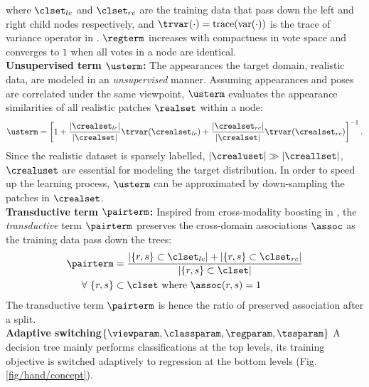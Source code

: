 where $\clset_{lc}$ and $\clset_{rc}$ are the training data that pass down the left and right child nodes respectively, and $\trvar(\cdot) = \mathrm{trace}(\mathrm{var}(\cdot))$ is the trace of variance operator in \cite{Gall2011}. 
$\regterm$ increases with compactness in vote space and converges to $1$ when all votes in a node are identical. \\ 
\textbf{Unsupervised term $\usterm$:} The appearances the target domain, \ie realistic data, are modeled in an \emph{unsupervised} manner. 
Assuming appearances and poses are correlated under the same viewpoint, $\usterm$ evaluates the appearance similarities of all realistic patches $\realset$ within a node:    
\begin{equation}
	\usterm = \left[ 1 + 
	\frac{|\crealset_{lc}|}{|\crealset|} \trvar(\crealset_{lc}) +  
\frac{|\crealset_{rc}|}{|\crealset|} \trvar(\crealset_{rc}) \right]^{-1}.  
	\label{eq:usterm}
\end{equation}
Since the realistic dataset is sparsely labelled, \ie$|\crealuset| \gg |\creallset|$, $\crealuset$ are essential for modeling the target distribution. 
In order to speed up the learning process, $\usterm$ can be approximated by down-sampling the patches in $\crealset$. \\  
\textbf{Transductive term $\pairterm$:} 
Inspired from cross-modality boosting in \cite{Bronstein2010}, 
the \emph{transductive} term $\pairterm$ preserves the cross-domain associations $\assoc$ as the training data pass down the trees: 
\begin{equation}
	\begin{split}
	\pairterm &= 
	\frac{|\{r,s\} \subset \clset_{lc}| +  
	|\{r,s\} \subset \clset_{rc}|}{|\{r,s\} \subset \clset|} \\   
	\forall\ \{r,s\} &\subset \clset \mbox{ where } \assoc(r,s) = 1
	\end{split}
	\label{eq:pairterm}
\end{equation}
The transductive term $\pairterm$ is hence the ratio of preserved association after a split. \\
\textbf{Adaptive switching$\{\viewparam, \classparam, \regparam, \tssparam\}$} 
A decision tree mainly performs classifications at the top levels, its training objective is switched adaptively to regression at the bottom levels (Fig. \ref{fig/hand/concept}). 

